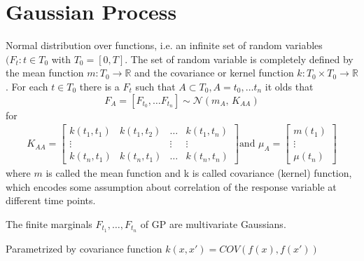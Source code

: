 
\chapter{Gaussian Process}

Normal distribution over functions, i.e. an infinite set of random
variables $(F_t: t \in T_0$ with $T_0=[0, T]$.
The set of random variable is completely defined by the
mean function $m: T_0 \to \mathbb{R}$ and the covariance or kernel
function $k: T_0 \times T_0 \to \mathbb{R}$.
For each $t \in T_0$ there is a $F_t$ such that
$A \subset T_0, A={t_0, \dots t_n}$
it olds that
\[F_A = [F_{t_0}, \dots F_{t_n}] \sim \mathcal{N}(m_A,\,K_{AA})\]
for
\begin{gather*}
    K_{AA} =
    \begin{bmatrix}
        k(t_1, t_1) & k(t_1, t_2) & \dots & k(t_1, t_n)\\
        \vdots  &  & \vdots  & \vdots \\
        k(t_n, t_1)  & k(t_n, t_1) & \dots  & k(t_n, t_n)
    \end{bmatrix} \text{and }
    \mu_A =
    \begin{bmatrix}
        m(t_1) \\
        \vdots \\
        \mu(t_n)
    \end{bmatrix}
\end{gather*}
where $m$ is called the mean function and k is called covariance (kernel) function, which encodes some assumption
about correlation of the response variable at different time points.

The finite marginals $F_{t_1}, \dots, F_{t_n}$ of GP are multivariate Gaussians.

Parametrized by covariance function $k(x,x') = COV(f(x), f(x'))$



